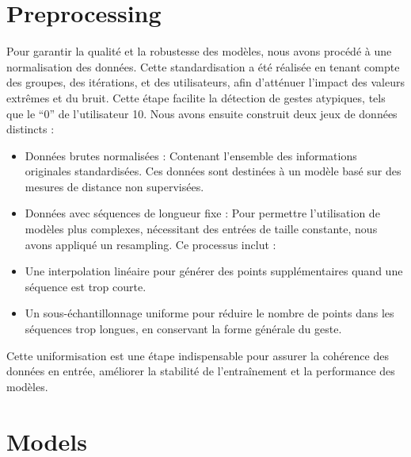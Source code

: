 \documentclass{article}
\begin{document}
\section{Preprocessing}
Pour garantir la qualité et la robustesse des modèles, nous avons procédé à une normalisation des données. Cette standardisation a été réalisée en tenant compte des groupes, des itérations, et des utilisateurs, afin d’atténuer l’impact des valeurs extrêmes et du bruit. Cette étape facilite la détection de gestes atypiques, tels que le “0” de l’utilisateur 10.
Nous avons ensuite construit deux jeux de données distincts :

\begin{itemize}
    \item Données brutes normalisées : Contenant l’ensemble des informations originales standardisées. Ces données sont destinées à un modèle basé sur des mesures de distance non supervisées.
    \item Données avec séquences de longueur fixe : Pour permettre l’utilisation de modèles plus complexes, nécessitant des entrées de taille constante, nous avons appliqué un resampling. Ce processus inclut :
    \item Une interpolation linéaire pour générer des points supplémentaires quand une séquence est trop courte.
    \item Un sous-échantillonnage uniforme pour réduire le nombre de points dans les séquences trop longues, en conservant la forme générale du geste.
\end{itemize}
Cette uniformisation est une étape indispensable pour assurer la cohérence des données en entrée, améliorer la stabilité de l’entraînement et la performance des modèles.

\section{Models}
\end{document}
